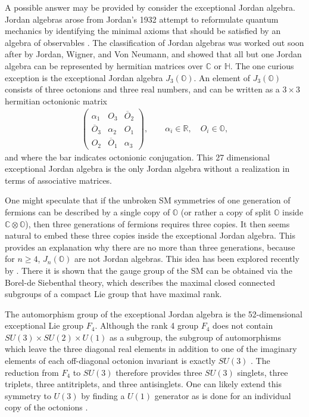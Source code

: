 \documentclass[a4paper]{jpconf}
\begin{document}
A possible answer may be provided by consider the exceptional Jordan algebra. Jordan algebras arose from Jordan's 1932 attempt to reformulate quantum mechanics by identifying the minimal axioms that should be satisfied by an algebra of observables \cite{mccrimmon2006taste}. The classification of Jordan algebras was worked out soon after by Jordan, Wigner, and Von Neumann, and showed that all but one Jordan algebra can be represented by hermitian matrices over $\mathbb{C}$ or $\mathbb{H}$. The one curious exception is the exceptional Jordan algebra $J_3(\mathbb{O})$. An element of $J_3(\mathbb{O})$ consists of three octonions and three real numbers, and can be written as a $3\times 3$ hermitian octonionic matrix
\begin{eqnarray}
\begin{pmatrix}
\alpha_1 & O_3 & \overline{O}_2 \\
\overline{O}_3 & \alpha_2 & O_1 \\
O_2 & \overline{O}_1 & \alpha_3
\end{pmatrix},\qquad \alpha_i\in\mathbb{R},\quad O_i\in \mathbb{O},
\end{eqnarray}
and where the bar indicates octonionic conjugation. This 27 dimensional exceptional Jordan algebra is the only Jordan algebra without a realization in terms of associative matrices. 

One might speculate that if the unbroken SM symmetries of one generation of fermions can be described by a single copy of $\mathbb{O}$ (or rather a copy of split $\mathbb{O}$ inside $\mathbb{C}\otimes\mathbb{O}$), then three generations of fermions requires three copies. It then seems natural to embed these three copies inside the exceptional Jordan algebra. This provides an explanation why there are no more than three generations, because for $n\geq 4$, $J_n(\mathbb{O})$ are not Jordan algebras. This idea has been explored recently by \cite{todorov2018deducing}. There it is shown that the gauge group of the SM can be obtained via the Borel-de Siebenthal theory, which describes the maximal closed connected subgroups of a compact Lie group that have maximal rank. 

The automorphism group of the exceptional Jordan algebra is the 52-dimensional exceptional Lie group $F_4$. Although the rank 4 group $F_4$ does not contain $SU(3)\times SU(2)\times U(1)$ as a subgroup, the subgroup of automorphisms which leave the three diagonal real elements in addition to one of the imaginary elements of each off-diagonal octonion invariant is exactly $SU(3)$ \cite{farnsworth2015standard}. The reduction from $F_4$ to $SU(3)$ therefore provides three $SU(3)$ singlets, three triplets, three antitriplets, and three antisinglets. One can likely extend this symmetry to $U(3)$ by finding a $U(1)$ generator as is done for an individual copy of the octonions \cite{furey2018three,dixon2013division}.
\end{document}
